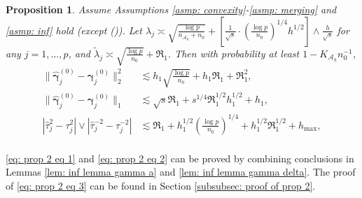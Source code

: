 \documentclass[12pt]{article}
\newcommand*{\rom}[1]{\romannumeral #1}
\newcommand{\twonorm}[1]{\|#1\|_{2}}
\newcommand{\onenorm}[1]{\|#1\|_{1}}
\newcommand{\norm}[1]{|#1|}
\newcommand{\htau}{\hat{\tau}}
\newcommand{\tlambda}{\tilde{\lambda}}
\newcommand{\bgammak}[1]{\bm{\gamma}^{(#1)}}
\newcommand{\hbgammak}[1]{\hat{\bm{\gamma}}^{(#1)}}
\newcommand{\mah}{\mathcal{A}_h}
\newcommand{\nah}{n_{\mathcal{A}_h}}
\newcommand{\Kah}{K_{\mah}}
\newcommand{\<}{\langle}
\renewcommand{\>}{\rangle}
\newtheorem{proposition}{Proposition}
\begin{document}
\begin{proposition}\label{prop: gamma rate}
	Assume Assumptions \ref{asmp: convexity}-\ref{asmp: merging} and \ref{asmp: inf} hold (except (\rom{5})). Let $\lambda_j \asymp \sqrt{\frac{\log p}{\nah+n_0}} + \left[\frac{1}{\sqrt{s}}\cdot \left(\frac{\log p}{n_0}\right)^{1/4}h^{1/2}\right] \wedge \frac{h}{\sqrt{s}}$ for any $j = 1, \ldots, p$, and $\tlambda_j \asymp \sqrt{\frac{\log p}{n_0}} + \Re_1$. Then with probability at least $1-\Kah n_0^{-1}$,
	\begin{align}
	\twonorm{\hbgammak{0}_j - \bgammak{0}_j}^2 &\lesssim h_1\sqrt{\frac{\log p}{n_0}} + h_1\Re_1 + \Re_1^2, \label{eq: prop 2 eq 1}\\
	\onenorm{\hbgammak{0}_j - \bgammak{0}_j} &\lesssim \sqrt{s}\Re_1 + s^{1/4}\Re_1^{1/2}h_1^{1/2} + h_1, \label{eq: prop 2 eq 2}\\
	\norm{\htau^2_j - \tau_j^2} \vee \norm{\htau^{-2}_j - \tau_j^{-2}} &\lesssim \Re_1 + h^{1/2}_1\left(\frac{\log p}{n_0}\right)^{1/4} + h_1^{1/2}\Re_1^{1/2}+h_{\max}, \label{eq: prop 2 eq 3}\\
\end{align}
\end{proposition}

\eqref{eq: prop 2 eq 1} and \eqref{eq: prop 2 eq 2} can be proved by combining conclusions in Lemmas \ref{lem: inf lemma gamma a} and \ref{lem: inf lemma gamma delta}. The proof of \eqref{eq: prop 2 eq 3} can be found in Section \ref{subsubsec: proof of prop 2}.
\end{document}
